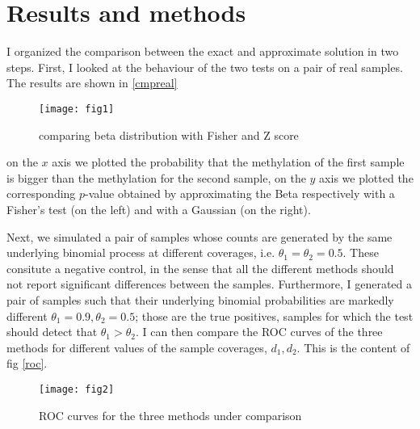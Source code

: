\documentclass[11pt]{amsart}
\begin{document}
\section{Results and methods} 
I organized the comparison between the exact and approximate solution in two steps. First,
I looked at the behaviour of the two tests on a pair of real samples. The results are shown in \ref{cmpreal}
\begin{figure}[h]
\caption{comparing beta distribution with Fisher and Z score}
\texttt{[image: fig1]}
\end{figure}\label{cmpreal}
on the $x$ axis we plotted the probability that the methylation of the first sample is bigger than the methylation for the second sample, on the $y$ axis we plotted the corresponding $p$-value obtained by approximating the Beta respectively with a Fisher's test (on the left) and with a Gaussian (on the right).

Next, we simulated a pair of samples whose counts are generated by the same underlying binomial process at different coverages, i.e. $\theta_1=\theta_2=0.5$. These consitute a negative control, in the sense that all the different methods should not report significant differences between the samples. Furthermore, I generated a pair of samples such that their underlying binomial probabilities are markedly different $\theta_1=0.9,\theta_2=0.5$; those are the true positives, samples for which the test should detect that $\theta_1>\theta_2$. I can then compare the ROC curves of the three methods for different values of the sample coverages, $d_1,d_2$. 
This is the content of fig \ref{roc}.
\begin{figure}[h]
\caption{ROC curves for the three methods under comparison}
\texttt{[image: fig2]}
\end{figure}\label{roc}
\end{document}
